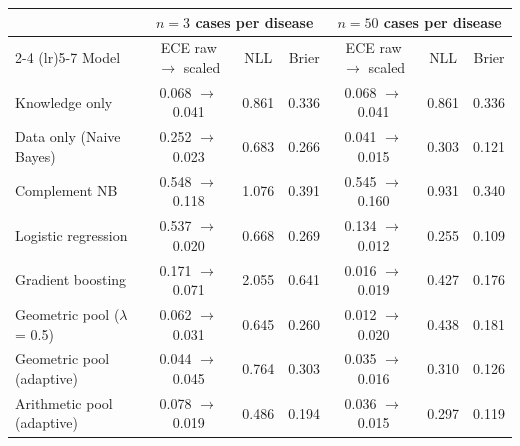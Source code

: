 \begin{tabular*}{\textwidth}{@{\extracolsep{\fill}}lcccccc@{}}
\toprule
 & \multicolumn{3}{c}{$n=3$ cases per disease} & \multicolumn{3}{c}{$n=50$ cases per disease} \\
\cmidrule(lr){2-4} \cmidrule(lr){5-7}
Model & ECE raw $\to$ scaled & NLL & Brier & ECE raw $\to$ scaled & NLL & Brier \\
\midrule
Knowledge only & 0.068 $\to$ 0.041 & 0.861 & 0.336 & 0.068 $\to$ 0.041 & 0.861 & 0.336 \\
Data only (Naive Bayes) & 0.252 $\to$ 0.023 & 0.683 & 0.266 & 0.041 $\to$ 0.015 & 0.303 & 0.121 \\
Complement NB & 0.548 $\to$ 0.118 & 1.076 & 0.391 & 0.545 $\to$ 0.160 & 0.931 & 0.340 \\
Logistic regression & 0.537 $\to$ 0.020 & 0.668 & 0.269 & 0.134 $\to$ 0.012 & 0.255 & 0.109 \\
Gradient boosting & 0.171 $\to$ 0.071 & 2.055 & 0.641 & 0.016 $\to$ 0.019 & 0.427 & 0.176 \\
Geometric pool ($\lambda$ = 0.5) & 0.062 $\to$ 0.031 & 0.645 & 0.260 & 0.012 $\to$ 0.020 & 0.438 & 0.181 \\
Geometric pool (adaptive) & 0.044 $\to$ 0.045 & 0.764 & 0.303 & 0.035 $\to$ 0.016 & 0.310 & 0.126 \\
Arithmetic pool (adaptive) & 0.078 $\to$ 0.019 & 0.486 & 0.194 & 0.036 $\to$ 0.015 & 0.297 & 0.119 \\
\bottomrule
\end{tabular*}
